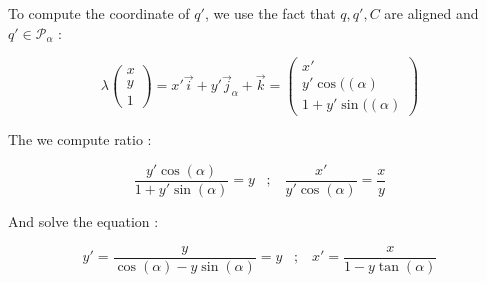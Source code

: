 {To compute the coordinate of $q'$, we use the fact that $q,q',C$ are aligned and $q' \in \mathcal{P}_\alpha$ :

\begin{equation}
        \lambda \begin{pmatrix} x \\ y  \\ 1  \end{pmatrix}
      = x'  \vec{i} + y' \vec{j}_\alpha  + \vec{k}
      =	\begin{pmatrix} x' \\ y'\cos((\alpha)  \\ 1+y'\sin((\alpha)  \end{pmatrix}
\end{equation}


The we compute ratio :

\begin{equation}
	\frac{y'\cos(\alpha)}{1+y'\sin(\alpha)} =  y \;\;\; ; \;\;\;  
	\frac{x'}{y'\cos(\alpha)} =  \frac{x}{y} 
\end{equation}

And solve the equation :

\begin{equation}
	y' = \frac{y}{\cos(\alpha) -y \sin(\alpha)} =  y \;\;\; ; \;\;\;
	x' = \frac{x}{1-y \tan(\alpha)}
\end{equation}
}


